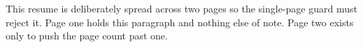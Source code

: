 \documentclass{article}
\begin{document}
This resume is deliberately spread across two pages so the single-page guard
must reject it. Page one holds this paragraph and nothing else of note.
\newpage
Page two exists only to push the page count past one.
\end{document}

